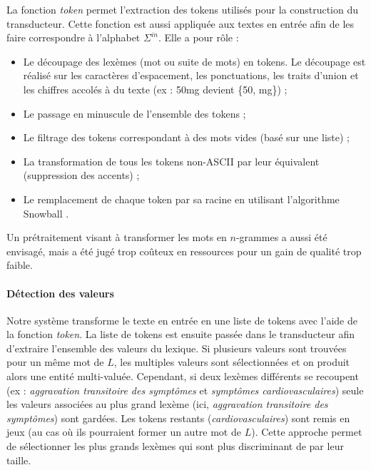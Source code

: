 La fonction \textit{token} permet l'extraction des tokens utilisés pour la construction du transducteur.
Cette fonction est aussi appliquée aux textes en entrée afin de les faire correspondre à l'alphabet $\Sigma^{in}$.
Elle a pour rôle :
\begin{itemize}
    \item Le découpage des lexèmes (mot ou suite de mots) en tokens.
          Le découpage est réalisé sur les caractères d'espacement, les ponctuations, les traits d'union et les chiffres accolés à du texte (ex : 50mg devient \{50, mg\}) ;  %
    \item Le passage en minuscule de l'ensemble des tokens ;                                                                                                                  %
    \item Le filtrage des tokens correspondant à des mots vides (basé sur une liste) ;                                                                                        %
    \item La transformation de tous les tokens non-ASCII par leur équivalent (suppression des accents) ;                                                                      %
    \item Le remplacement de chaque token par sa racine en utilisant l'algorithme Snowball \cite{porterSnowballLanguageStemming2001}.                                         %
\end{itemize}

Un prétraitement visant à transformer les mots en $n$-grammes a aussi été envisagé, mais a été jugé trop coûteux en ressources pour un gain de qualité trop faible.

\paragraph{Détection des valeurs}
Notre système transforme le texte en entrée en une liste de tokens avec l'aide de la fonction \textit{token}.
La liste de tokens est ensuite passée dans le transducteur afin d'extraire l'ensemble des valeurs du lexique.
Si plusieurs valeurs sont trouvées pour un même mot de $L$, les multiples valeurs sont sélectionnées et on produit alors une entité multi-valuée.
Cependant, si deux lexèmes différents se recoupent (ex : \emph{aggravation transitoire des symptômes} et \emph{symptômes cardiovasculaires}) seule les valeurs associées au plus grand lexème (ici, \emph{aggravation transitoire des symptômes}) sont gardées.
Les tokens restants (\emph{cardiovasculaires}) sont remis en jeux (au cas où ils pourraient former un autre mot de $L$).
Cette approche permet de sélectionner les plus grands lexèmes qui sont plus discriminant de par leur taille.


